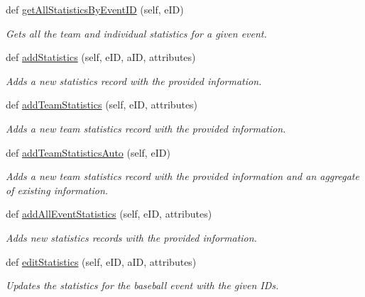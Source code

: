 \begin{DoxyCompactItemize}
def \hyperlink{classhandler_1_1baseball__event_1_1_baseball_event_handler_a0fbccaf46efe1a468dcd4ff43359c203}{get\+All\+Statistics\+By\+Event\+ID} (self, e\+ID)
\begin{DoxyCompactList}\small\item\em Gets all the team and individual statistics for a given event. \end{DoxyCompactList}\item 
def \hyperlink{classhandler_1_1baseball__event_1_1_baseball_event_handler_aa6636546cf97f1303fba6eb4cc3888d1}{add\+Statistics} (self, e\+ID, a\+ID, attributes)
\begin{DoxyCompactList}\small\item\em Adds a new statistics record with the provided information. \end{DoxyCompactList}\item 
def \hyperlink{classhandler_1_1baseball__event_1_1_baseball_event_handler_a1cd2d0154941bfebabfcd2e5008a5535}{add\+Team\+Statistics} (self, e\+ID, attributes)
\begin{DoxyCompactList}\small\item\em Adds a new team statistics record with the provided information. \end{DoxyCompactList}\item 
def \hyperlink{classhandler_1_1baseball__event_1_1_baseball_event_handler_a9e27b33f6b02e720e23cca07dbfd37d2}{add\+Team\+Statistics\+Auto} (self, e\+ID)
\begin{DoxyCompactList}\small\item\em Adds a new team statistics record with the provided information and an aggregate of existing information. \end{DoxyCompactList}\item 
def \hyperlink{classhandler_1_1baseball__event_1_1_baseball_event_handler_ad31af1745eed5de470289edf428ac460}{add\+All\+Event\+Statistics} (self, e\+ID, attributes)
\begin{DoxyCompactList}\small\item\em Adds new statistics records with the provided information. \end{DoxyCompactList}\item 
def \hyperlink{classhandler_1_1baseball__event_1_1_baseball_event_handler_a9fd84dd8bbbab63b021d9c00e3d89eb2}{edit\+Statistics} (self, e\+ID, a\+ID, attributes)
\begin{DoxyCompactList}\small\item\em Updates the statistics for the baseball event with the given I\+Ds. \end{DoxyCompactList}\item 

\end{DoxyCompactItemize}
